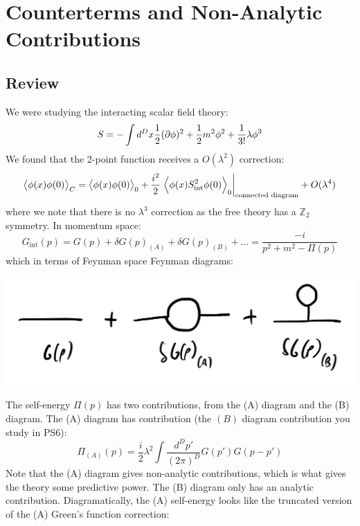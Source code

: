 \section{Counterterms and Non-Analytic Contributions}
\subsection{Review}
We were studying the interacting scalar field theory:
\begin{equation}
    S = -\int d^Dx \frac{1}{2}(\partial\phi)^2 + \frac{1}{2}m^2\phi^2 + \frac{1}{3!}\lambda \phi^3
\end{equation}
We found that the 2-point function receives a $O(\lambda^2)$ correction:
\begin{equation}
    \left< \phi(x)\phi(0) \right>_C = \left< \phi(x)\phi(0) \right>_0 + \frac{i^2}{2}\left.\left< \phi(x)S_{\text{int}}^2 \phi(0) \right>_0\right|_{\text{connected diagram}} + O(\lambda^4)
\end{equation}
where we note that there is no $\lambda^3$ correction as the free theory has a $\mathbb{Z}_2$ symmetry. In momentum space:
\begin{equation}
    G_{\text{int}}(p) = G(p) + \delta G(p)_{(A)} + \delta G(p)_{(B)} + \ldots = \frac{-i}{p^2 + m^2- \Pi(p)}
\end{equation}
which in terms of Feynman space Feynman diagrams:

\begin{center}
    \includegraphics[scale=0.3]{Lectures/Figures/lec13-threediagrams.png}
\end{center}

The self-energy $\Pi(p)$ has two contributions, from the (A) diagram and the (B) diagram. The (A) diagram has contribution (the $(B)$ diagram contribution you study in PS6):
\begin{equation}
    \Pi_{(A)}(p) = \frac{i}{2}\lambda^2\int \frac{d^Dp'}{(2\pi)^D}G(p')G(p - p')
\end{equation}
Note that the (A) diagram gives non-analytic contributions, which is what gives the theory some predictive power. The (B) diagram only has an analytic contribution. Diagramatically, the (A) self-energy looks like the truncated version of the (A) Green's function correction:


